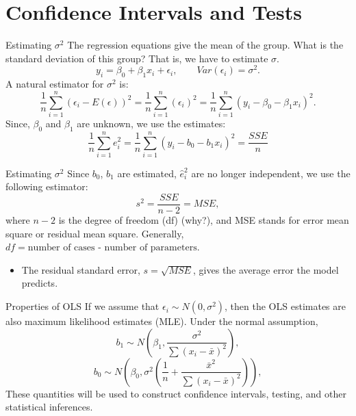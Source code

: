 \documentclass[
  ignorenonframetext,
]{beamer}
\providecommand{\tightlist}{%
  \setlength{\itemsep}{0pt}\setlength{\parskip}{0pt}}
\begin{document}
\hypertarget{confidence-intervals-and-tests}{%
\section{Confidence Intervals and
Tests}\label{confidence-intervals-and-tests}}

\begin{frame}{Estimating \(\sigma^2\)}
\protect\hypertarget{estimating-sigma2}{}
The regression equations give the mean of the group. What is the
standard deviation of this group? That is, we have to estimate
\(\sigma\).
\[ y_i=\beta_0+\beta_1x_i+\epsilon_i, \quad \quad Var(\epsilon_i)=\sigma^2.\]
A natural estimator for \(\sigma^2\) is:
\[\frac{1}{n}\sum_{i=1}^n(\epsilon_i-E(\epsilon))^2=\frac{1}{n}\sum_{i=1}^n(\epsilon_i)^2=\frac{1}{n}\sum_{i=1}^n(y_i-\beta_0-\beta_1x_i)^2.\]
Since, \(\beta_0\) and \(\beta_1\) are unknown, we use the estimates:
\[ \frac{1}{n}\sum_{i=1}^ne_i^2=\frac{1}{n}\sum_{i=1}^n(y_i-b_0-b_1x_i)^2=\frac{SSE}{n}\]
\end{frame}

\begin{frame}{Estimating \(\sigma^2\)}
\protect\hypertarget{estimating-sigma2-1}{}
Since \(b_0\), \(b_1\) are estimated, \(\hat{e}_i^2\) are no longer
independent, we use the following estimator:
\[ s^2=\frac{SSE}{n-2}=MSE,\] where \(n-2\) is the degree of freedom
(df) (why?), and MSE stands for error mean square or residual mean
square. Generally, \(df=\text{number of cases - number of parameters}\).

\begin{itemize}
\tightlist
\item
  The residual standard error, \(s=\sqrt{MSE}\), gives the average error
  the model predicts.
\end{itemize}
\end{frame}

\begin{frame}{Properties of OLS}
\protect\hypertarget{properties-of-ols}{}
If we assume that \(\epsilon_i \sim N(0, \sigma^2)\), then the OLS
estimates are also maximum likelihood estimates (MLE). Under the normal
assumption,
\[b_1\sim N\left(\beta_1 , \frac{\sigma^2}{\sum(x_i-\bar{x})^2}\right),\]
\[b_0\sim N\left(\beta_0 , \sigma^2\left(\frac{1}{n}+\frac{\bar{x}^2}{\sum(x_i-\bar{x})^2}\right)\right),\]
These quantities will be used to construct confidence intervals,
testing, and other statistical inferences.
\end{frame}
\end{document}
